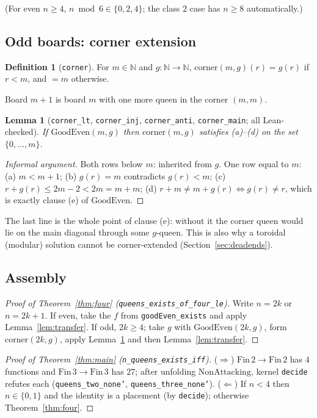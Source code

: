 \documentclass[11pt,a4paper]{article}
\newtheorem{lemma}[theorem]{Lemma}
\theoremstyle{definition}
\newtheorem{definition}[theorem]{Definition}
\theoremstyle{remark}
\newcommand{\lean}[1]{\texttt{#1}}
\newcommand{\N}{\mathbb{N}}
\newcommand{\Fin}{\mathrm{Fin}\,}
\newcommand{\NonAttacking}{\mathrm{NonAttacking}}
\newcommand{\GoodEven}{\mathrm{GoodEven}}
\begin{document}
(For even $n\ge 4$, $n\bmod 6\in\{0,2,4\}$; the class $2$ case has $n\ge 8$ automatically.)

\subsection{Odd boards: corner extension}

\begin{definition}[\lean{corner}]
For $m\in\N$ and $g:\N\to\N$, $\mathrm{corner}(m,g)(r)=g(r)$ if $r<m$, and $=m$ otherwise.
\end{definition}

Board $m+1$ is board $m$ with one more queen in the corner $(m,m)$.

\begin{lemma}[\lean{corner\_lt}, \lean{corner\_inj}, \lean{corner\_anti}, \lean{corner\_main}; all Lean-checked]
\label{lem:corner}
If $\GoodEven(m,g)$ then $\mathrm{corner}(m,g)$ satisfies (a)--(d) on the set
$\{0,\dots,m\}$.
\end{lemma}
\begin{proof}[Informal argument]
Both rows below $m$: inherited from $g$. One row equal to $m$:
(a) $m<m+1$; (b) $g(r)=m$ contradicts $g(r)<m$; (c) $r+g(r)\le 2m-2<2m=m+m$;
(d) $r+m\neq m+g(r)\iff g(r)\neq r$, which is exactly clause (e) of $\GoodEven$.
\end{proof}

The last line is the whole point of clause (e): without it the corner queen would lie on
the main diagonal through some $g$-queen. This is also why a toroidal (modular) solution
cannot be corner-extended (Section~\ref{sec:deadends}).

\subsection{Assembly}

\begin{proof}[Proof of Theorem~\ref{thm:four} (\lean{queens\_exists\_of\_four\_le})]
Write $n=2k$ or $n=2k+1$. If even, take the $f$ from \lean{goodEven\_exists} and apply
Lemma~\ref{lem:transfer}. If odd, $2k\ge 4$; take $g$ with $\GoodEven(2k,g)$, form
$\mathrm{corner}(2k,g)$, apply Lemma~\ref{lem:corner} and then Lemma~\ref{lem:transfer}.
\end{proof}

\begin{proof}[Proof of Theorem~\ref{thm:main} (\lean{n\_queens\_exists\_iff})]
($\Rightarrow$) $\Fin 2\to\Fin 2$ has $4$ functions and $\Fin 3\to\Fin 3$ has $27$; after
unfolding $\NonAttacking$, kernel \lean{decide} refutes each
(\lean{queens\_two\_none'}, \lean{queens\_three\_none'}). ($\Leftarrow$) If $n<4$ then
$n\in\{0,1\}$ and the identity is a placement (by \lean{decide}); otherwise
Theorem~\ref{thm:four}.
\end{proof}
\end{document}
